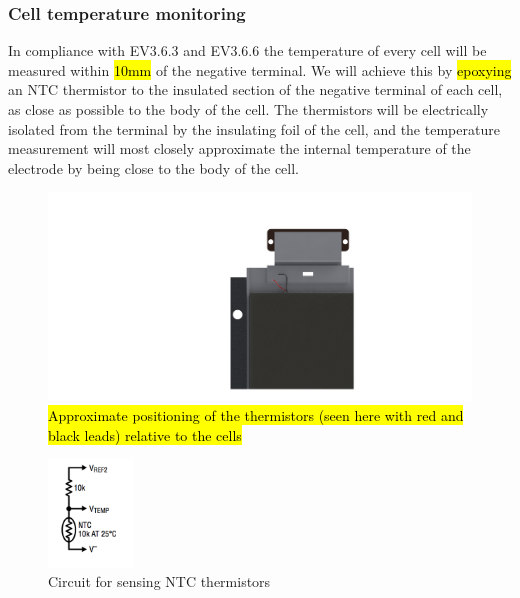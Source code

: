 \documentclass{article}
\DeclareRobustCommand{\hlr}[1]{{\sethlcolor{pink}\hl{#1}}}
\begin{document}
\subsubsection{Cell temperature monitoring}\label{accumulator_cell_temperature_monitoring}

In compliance with EV3.6.3 and EV3.6.6 the temperature of every cell will be measured within \hlr{10mm} of the negative terminal. We will achieve this by \hl{epoxying} an NTC thermistor to the insulated section of the negative terminal of each cell, as close as possible to the body of the cell. The thermistors will be electrically isolated from the terminal by the insulating foil of the cell, and the temperature measurement will most closely approximate the internal temperature of the electrode by being close to the body of the cell. 

\begin{figure}[H]
    \centering
    \includegraphics[width=1\textwidth]{thermistor}
    \caption{\hl{Approximate positioning of the thermistors (seen here with red and black leads) relative to the cells}}
    \label{fig:cell_temp_monitor}
\end{figure}

\begin{figure}[H]
    \centering
    \includegraphics[width=0.2\textwidth]{therm_circuit}
    \caption{Circuit for sensing NTC thermistors}
    \label{fig:therm_circuit}
\end{figure}
\end{document}
